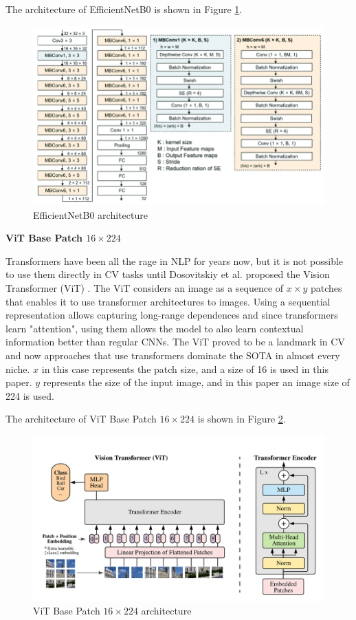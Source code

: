 \documentclass[a4paper,11pt,openright]{book}
\begin{document}
The architecture of EfficientNetB0 is shown in Figure \ref{fig:efficientnetb0}.
\begin{figure}[!htb]
    \centering
    \includegraphics[width=.6\linewidth]{images/effnetarch.png}
    \caption{EfficientNetB0 architecture}
    \label{fig:efficientnetb0}
\end{figure}


\textbf{ViT Base Patch $16 \times 224$}

Transformers have been all the rage in NLP for years now, but it is not possible to use them directly in CV tasks until Dosovitskiy et al. proposed the Vision Transformer (ViT) \cite{dosovitskiyImageWorth16x162021}. The ViT considers an image as a sequence of $x \times y$ patches that enables it to use transformer architectures to images. Using a sequential representation allows capturing long-range dependences and since transformers learn "attention", using them allows the model to also learn contextual information better than regular CNNs. The ViT proved to be a landmark in CV and now approaches that use transformers dominate the SOTA in almost every niche. $x$ in this case represents the patch size, and a size of 16 is used in this paper. $y$ represents the size of the input image, and in this paper an image size of 224 is used. 

The architecture of ViT Base Patch $16 \times 224$ is shown in Figure \ref{fig:vit}.
\begin{figure}[!htb]
    \centering
    \includegraphics[width=.6\linewidth]{images/vitarch.png}
    \caption{ViT Base Patch $16 \times 224$ architecture}
    \label{fig:vit}
\end{figure}
\end{document}
